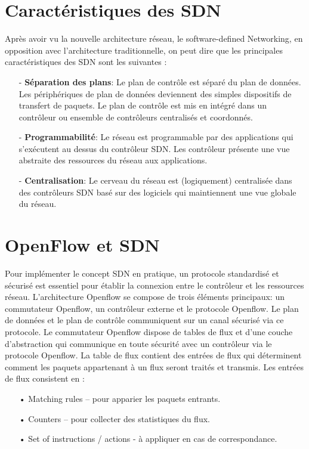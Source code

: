 \section{Caractéristiques des SDN}
Après avoir vu la nouvelle architecture réseau, le software-defined Networking, en opposition avec l'architecture traditionnelle, on peut dire que les principales caractéristiques des SDN sont les suivantes :\\
\begin{itemize}
\item[-]\textbf{Séparation des plans}: Le plan de contrôle est séparé du plan de données. Les périphériques de plan de données deviennent des simples dispositifs de transfert de paquets. Le plan de contrôle est mis en intégré dans un contrôleur ou ensemble de contrôleurs centralisés et coordonnés.\\
\item[-]\textbf{Programmabilité}: Le réseau est programmable par des applications qui s’exécutent au dessus du contrôleur SDN. Les contrôleur présente une vue abstraite des ressources du réseau aux applications.\\
\item[-]\textbf{Centralisation}: Le cerveau du réseau est (logiquement) centralisée dans des contrôleurs SDN basé sur des logiciels qui maintiennent une vue globale du réseau.
\end{itemize}

\section{OpenFlow et SDN}
\label{S_OpenFlow}
Pour implémenter le concept SDN en pratique, un protocole standardisé et sécurisé est essentiel  pour établir la connexion entre le contrôleur et les ressources réseau. L’architecture Openflow se compose de trois éléments principaux: un commutateur Openflow, un contrôleur externe et le protocole Openflow. Le plan de données et le plan de contrôle communiquent sur un canal sécurisé via ce protocole. Le commutateur Openflow dispose de tables de flux et d’une couche d’abstraction qui communique en toute sécurité avec un contrôleur via le protocole Openflow. La table de flux contient des entrées de flux qui déterminent comment les paquets appartenant à un flux seront traités et transmis. 
Les entrées de flux consistent en :\\

\begin{itemize}
\item[•] Matching rules – pour apparier les paquets entrants.
\item[•] Counters – pour collecter des statistiques du flux.
\item[•] Set of instructions / actions - à appliquer en cas de correspondance.\\
\end{itemize}

